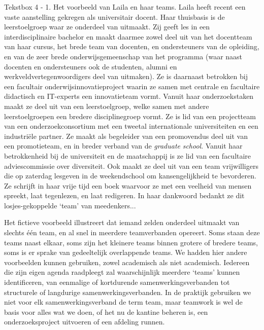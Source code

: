 \documentclass[smallauthor, chapterhaspagenum, nochapterinheader, pagenuminheader,  bigchapnum,medium2, tocpages,  garamond, titleinheader]{jote-book}
\begin{document}
	\begin{bookbox}{Tekstbox 4 - 1. Het voorbeeld van Laila en haar teams.}
		Laila heeft recent een vaste aanstelling gekregen als universitair docent. Haar thuisbasis is de leerstoelgroep waar ze onderdeel van uitmaakt. Zij geeft les in een interdisciplinaire bachelor en maakt daarmee zowel deel uit van het docentteam van haar cursus, het brede team van docenten, en ondersteuners van de opleiding, en van de zeer brede onderwijsgemeenschap van het programma (waar naast docenten en ondersteuners ook de studenten, alumni en werkveldvertegenwoordigers deel van uitmaken). Ze is daarnaast betrokken bij een facultair onderwijsinnovatieproject waarin ze samen met centrale en facultaire didactisch en IT-experts een innovatieteam vormt. Vanuit haar onderzoekstaken maakt ze deel uit van een leerstoelgroep, welke samen met andere leerstoelgroepen een bredere disciplinegroep vormt. Ze is lid van een projectteam van een onderzoekconsortium met een tweetal internationale universiteiten en een industriële partner. Ze maakt als begeleider van een promovendus deel uit van een promotieteam, en in breder verband van de \emph{graduate}\emph{ school}. Vanuit haar betrokkenheid bij de universiteit en de maatschappij is ze lid van een facultaire adviescommissie over diversiteit. Ook maakt ze deel uit van een team vrijwilligers die op zaterdag lesgeven in de weekendschool om kansengelijkheid te bevorderen. Ze schrijft in haar vrije tijd een boek waarvoor ze met een veelheid van mensen spreekt, laat tegenlezen, en laat redigeren. In haar dankwoord bedankt ze dit losjes-gekoppelde ‘team' van meedenkers...
	\end{bookbox}

	Het fictieve voorbeeld illustreert dat iemand zelden onderdeel uitmaakt van slechts één team, en al snel in meerdere teamverbanden opereert. Soms staan deze teams naast elkaar, soms zijn het kleinere teams binnen grotere of bredere teams, soms is er sprake van gedeeltelijk overlappende teams. We hadden hier andere voorbeelden kunnen gebruiken, zowel academisch als niet academisch. Iedereen die zijn eigen agenda raadpleegt zal waarschijnlijk meerdere ‘teams' kunnen identificeren, van eenmalige of kortdurende samenwerkingsverbanden tot structurele of langdurige samenwerkingsverbanden. In de praktijk gebruiken we niet voor elk samenwerkingsverband de term team, maar teamwork is wel de basis voor alles wat we doen, of het nu de kantine beheren is, een onderzoeksproject uitvoeren of een afdeling runnen.
\end{document}
